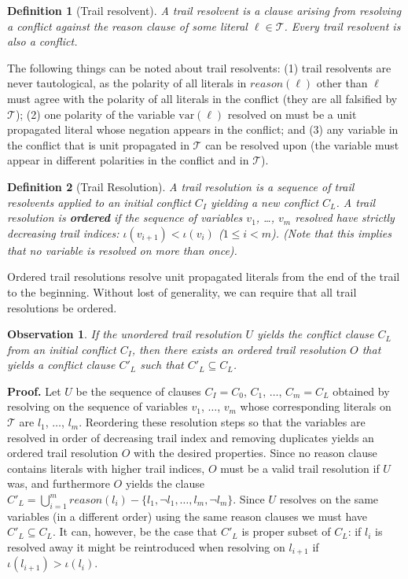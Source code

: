 \documentclass[runningheads]{llncs}
\newcommand{\trail}{\ensuremath{\mathcal{T}}}
\newcommand{\trailIdx}[1]{\ensuremath{\iota(#1)}}
\newcommand{\var}{\text{var}}
\newcommand{\reason}[1]{\ensuremath{\mathit{reason}(#1)}}
\newtheorem{Obs}{Observation}
\newtheorem{defn}{Definition}
\newcommand{\whitebox}{\raisebox{.5ex}{\fbox{\hspace*{.2ex}}}}
\begin{document}
\begin{defn}[Trail resolvent]
    A trail resolvent is a clause arising from resolving a conflict
    against the reason clause of some literal $\ell \in \trail$. Every
    trail resolvent is also a conflict.
\end{defn}

The following things can be noted about trail resolvents: (1) trail
resolvents are never tautological, as the polarity of all literals in
$\reason{\ell}$ other than $\ell$ must agree with the polarity of all
literals in the conflict (they are all falsified by $\trail$); (2) one
polarity of the variable $\var(\ell)$ resolved on must be a unit
propagated literal whose negation appears in the conflict; and (3) any
variable in the conflict that is unit propagated in $\trail$ can be
resolved upon (the variable must appear in different polarities in the
conflict and in $\trail$).

\begin{defn}[Trail Resolution]
    A trail resolution is a sequence of trail resolvents applied to an
    initial conflict $C_I$ yielding a new conflict $C_L$.  A trail
    resolution is \textbf{ordered} if the sequence of variables $v_1$,
    \dots, $v_m$ resolved have strictly decreasing trail indices:
    $\trailIdx{v_{i+1}} < \trailIdx{v_i}$ ($1\leq i < m$). (Note that
    this implies that no variable is resolved on more than once).
\end{defn}

Ordered trail resolutions resolve unit propagated literals from the
end of the trail to the beginning. Without lost of generality, we can
require that all trail resolutions be ordered.

\begin{Obs}
    If the unordered trail resolution $U$ yields the conflict clause
    $C_L$ from an initial conflict $C_I$, then there exists an ordered
    trail resolution $O$ that yields a conflict clause $C'_L$ such
    that $C'_L\subseteq C_L$.
\end{Obs}
\noindent
\textbf{Proof.} Let $U$ be the sequence of clauses $C_I = C_0$, $C_1$,
$\ldots$, $C_m= C_L$ obtained by resolving on the sequence of
variables $v_1$, $\ldots$, $v_m$ whose corresponding literals on
$\trail$ are $l_1$, $\ldots$, $l_m$. Reordering these resolution steps
so that the variables are resolved in order of decreasing trail index
and removing duplicates yields an ordered trail resolution $O$ with
the desired properties. Since no reason clause contains literals with
higher trail indices, $O$ must be a valid trail resolution if $U$
was, and furthermore $O$ yields the clause
$C'_L = \bigcup_{i=1}^m \reason{l_i} - \{l_1, \lnot l_1, \ldots, l_m,
\lnot l_m\}$. Since $U$ resolves on the same variables (in a different
order) using the same reason clauses we must have $C'_L\subseteq
C_L$. It can, however, be the case that $C'_L$ is proper subset of
$C_L$: if $l_i$ is resolved away it might be reintroduced when
resolving on $l_{i+1}$ if $\trailIdx{l_{i+1}}  > \trailIdx{l_i}$.
\whitebox
\end{document}
